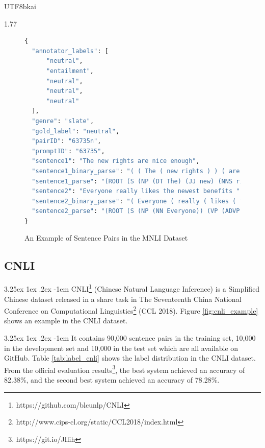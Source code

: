 \documentclass[12pt]{article}
\makeatletter
\renewcommand\paragraph{\@startsection{paragraph}{5}{\z@}%
  {3.25ex \@plus1ex \@minus.2ex}%
  {-1em}%
  {\normalfont\normalsize\bfseries}}
\makeatother
\begin{document}
\begin{CJK*}{UTF8}{bkai}
\begin{spacing}{1.77}
\begin{figure}
\caption{An Example of Sentence Pairs in the MNLI Dataset}
\begin{minipage}{\linewidth}
\begin{lstlisting}[language=Python]
{
  "annotator_labels": [
      "neutral",
      "entailment",
      "neutral",
      "neutral",
      "neutral"
  ],
  "genre": "slate",
  "gold_label": "neutral",
  "pairID": "63735n",
  "promptID": "63735",
  "sentence1": "The new rights are nice enough",
  "sentence1_binary_parse": "( ( The ( new rights ) ) ( are ( nice enough ) ) )",
  "sentence1_parse": "(ROOT (S (NP (DT The) (JJ new) (NNS rights)) (VP (VBP are) (ADJP (JJ nice) (RB enough)))))",
  "sentence2": "Everyone really likes the newest benefits ",
  "sentence2_binary_parse": "( Everyone ( really ( likes ( the ( newest benefits ) ) ) ) )",
  "sentence2_parse": "(ROOT (S (NP (NN Everyone)) (VP (ADVP (RB really)) (VBZ likes) (NP (DT the) (JJS newest) (NNS benefits)))))"
}
\end{lstlisting}
\end{minipage}
\label{fig:mnli_example}
\end{figure}

\subsection{CNLI} \label{sec:cnli}
\paragraph{}
CNLI\footnote{https://github.com/blcunlp/CNLI} (Chinese Natural Language Inference) is a Simplified Chinese dataset released in a share task in The Seventeenth China National Conference on Computational Linguistics\footnote{http://www.cips-cl.org/static/CCL2018/index.html} (CCL 2018). Figure \ref{fig:cnli_example} shows an example in the CNLI dataset.

\paragraph{}
It contains 90,000 sentence pairs in the training set, 10,000 in the development set and 10,000 in the test set which are all available on GitHub. Table \ref{tab:label_cnli} shows the label distribution in the CNLI dataset. From the official evaluation results\footnote{https://git.io/JIlih}, the best system achieved an accuracy of 82.38\%, and the second best system achieved an accuracy of 78.28\%.


\end{spacing}
\end{CJK*}
\end{document}
